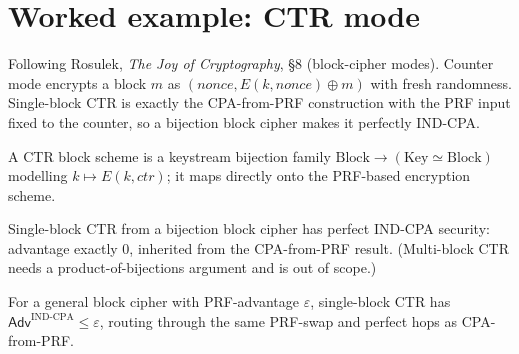 \chapter{Worked example: CTR mode}

Following Rosulek, \emph{The Joy of Cryptography}, §8 (block-cipher modes).
Counter mode encrypts a block $m$ as $(\mathit{nonce}, E(k, \mathit{nonce}) \oplus
m)$ with fresh randomness. Single-block CTR is exactly the CPA-from-PRF
construction with the PRF input fixed to the counter, so a bijection block cipher
makes it perfectly IND-CPA.

\begin{definition}
  \label{def:ctr}
  \leanok
  A CTR block scheme is a keystream bijection family $\mathrm{Block} \to
  (\mathrm{Key} \simeq \mathrm{Block})$ modelling $k \mapsto E(k, \mathit{ctr})$;
  it maps directly onto the PRF-based encryption scheme.
\end{definition}

\begin{theorem}
  \label{thm:ctr-perfect}
  \leanok
  Single-block CTR from a bijection block cipher has perfect IND-CPA security:
  advantage exactly $0$, inherited from the CPA-from-PRF result. (Multi-block CTR
  needs a product-of-bijections argument and is out of scope.)
\end{theorem}

\begin{theorem}
  \label{thm:ctr-bound}
  \leanok
  For a general block cipher with PRF-advantage $\varepsilon$, single-block CTR has
  $\mathsf{Adv}^{\mathrm{IND\text{-}CPA}} \le \varepsilon$, routing through the same
  PRF-swap and perfect hops as CPA-from-PRF.
\end{theorem}
